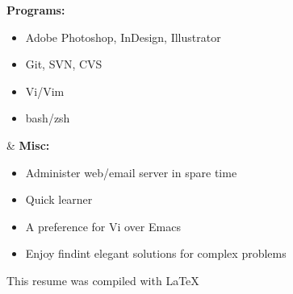 \documentclass[]{res}
\begin{document}
\begin{resume}
\begin{ncolumn}{2}
  {\bf Programs:}
  \begin{itemize}
  \item Adobe Photoshop, InDesign, Illustrator
  \item Git, SVN, CVS
  \item Vi/Vim
  \item bash/zsh
  \end{itemize}
&
  {\bf Misc:}
  \begin{itemize}
  \item Administer web/email server in spare time
  \item Quick learner
  \item A preference for Vi over Emacs
  \item Enjoy findint elegant solutions for complex problems
  \end{itemize}
\end{ncolumn}


\begin{center}
This resume was compiled with \LaTeX
\end{center}

\end{resume}
\end{document}
